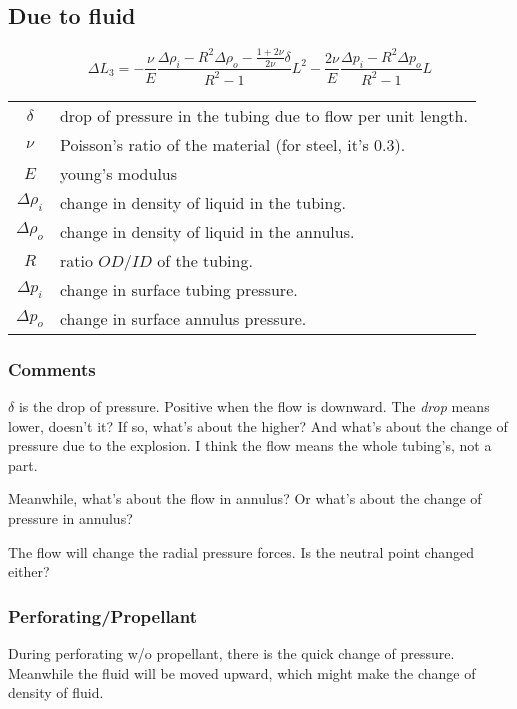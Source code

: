 \documentclass{article}
\begin{document}
\subsection{Due to fluid}
\begin{equation}
\Delta L_3 = - \frac{\nu}{E}\frac{\Delta \rho_i - R^2\Delta \rho_o -
  \frac{1+2\nu}{2\nu}\delta}{R^2 - 1}L^2 - \frac{2\nu}{E}\frac{\Delta p_i -
  R^2\Delta p_o}{R^2 - 1}L
\end{equation}
\begin{center}
\begin{tabular}{c l}
$\delta$ & drop of pressure in the tubing due to flow per unit length.\\
$\nu$ & Poisson's ratio of the material (for steel, it's 0.3). \\
$E$ & young's modulus \\
$\Delta \rho_i$ & change in density of liquid in the tubing. \\
$\Delta \rho_o$ & change in density of liquid in the annulus. \\
$R$ & ratio $OD/ID$ of the tubing. \\
$\Delta p_i$ & change in surface tubing pressure. \\
$\Delta p_o$ & change in surface annulus pressure. \\
\end{tabular}
\end{center}

\subsubsection{Comments}
$\delta$ is the drop of pressure. Positive when the flow is downward. The
\emph{drop} means lower, doesn't it? If so, what's about the higher? And
what's about the change of pressure due to the explosion. I think the flow
means the whole tubing's, not a part.

Meanwhile, what's about the flow in annulus? Or what's about the change of
pressure in annulus?

The flow will change the radial pressure forces. Is the neutral point changed
either?

\subsubsection{Perforating/Propellant}
During perforating w/o propellant, there is the quick change of
pressure. Meanwhile the fluid will be moved upward, which might make the
change of density of fluid.
\end{document}
